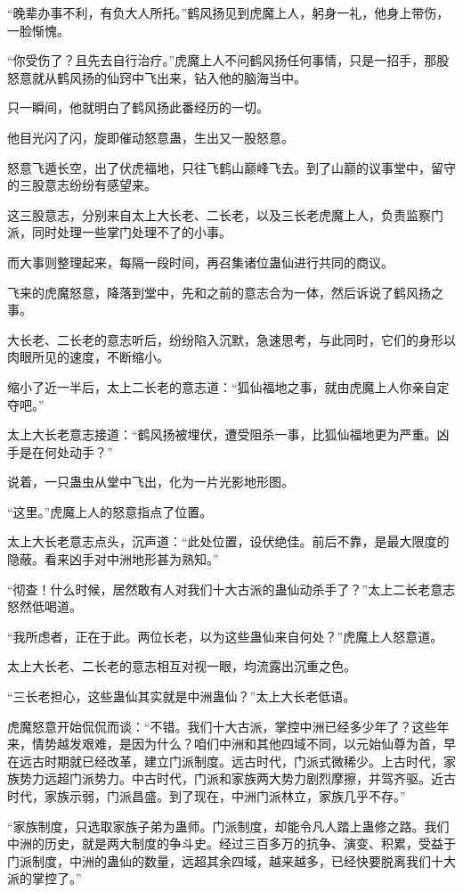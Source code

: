 \begin{this_body}
“晚辈办事不利，有负大人所托。”鹤风扬见到虎魔上人，躬身一礼，他身上带伤，一脸惭愧。

“你受伤了？且先去自行治疗。”虎魔上人不问鹤风扬任何事情，只是一招手，那股怒意就从鹤风扬的仙窍中飞出来，钻入他的脑海当中。

只一瞬间，他就明白了鹤风扬此番经历的一切。

他目光闪了闪，旋即催动怒意蛊，生出又一股怒意。

怒意飞遁长空，出了伏虎福地，只往飞鹤山巅峰飞去。到了山巅的议事堂中，留守的三股意志纷纷有感望来。

这三股意志，分别来自太上大长老、二长老，以及三长老虎魔上人，负责监察门派，同时处理一些掌门处理不了的小事。

而大事则整理起来，每隔一段时间，再召集诸位蛊仙进行共同的商议。

飞来的虎魔怒意，降落到堂中，先和之前的意志合为一体，然后诉说了鹤风扬之事。

大长老、二长老的意志听后，纷纷陷入沉默，急速思考，与此同时，它们的身形以肉眼所见的速度，不断缩小。

缩小了近一半后，太上二长老的意志道：“狐仙福地之事，就由虎魔上人你亲自定夺吧。”

太上大长老意志接道：“鹤风扬被埋伏，遭受阻杀一事，比狐仙福地更为严重。凶手是在何处动手？”

说着，一只蛊虫从堂中飞出，化为一片光影地形图。

“这里。”虎魔上人的怒意指点了位置。

太上大长老意志点头，沉声道：“此处位置，设伏绝佳。前后不靠，是最大限度的隐蔽。看来凶手对中洲地形甚为熟知。”

“彻查！什么时候，居然敢有人对我们十大古派的蛊仙动杀手了？”太上二长老意志怒然低喝道。

“我所虑者，正在于此。两位长老，以为这些蛊仙来自何处？”虎魔上人怒意道。

太上大长老、二长老的意志相互对视一眼，均流露出沉重之色。

“三长老担心，这些蛊仙其实就是中洲蛊仙？”太上大长老低语。

虎魔怒意开始侃侃而谈：“不错。我们十大古派，掌控中洲已经多少年了？这些年来，情势越发艰难，是因为什么？咱们中洲和其他四域不同，以元始仙尊为首，早在远古时期就已经改革，建立门派制度。远古时代，门派式微稀少。上古时代，家族势力远超门派势力。中古时代，门派和家族两大势力剧烈摩擦，并驾齐驱。近古时代，家族示弱，门派昌盛。到了现在，中洲门派林立，家族几乎不存。”

“家族制度，只选取家族子弟为蛊师。门派制度，却能令凡人踏上蛊修之路。我们中洲的历史，就是两大制度的争斗史。经过三百多万的抗争、演变、积累，受益于门派制度，中洲的蛊仙的数量，远超其余四域，越来越多，已经快要脱离我们十大派的掌控了。”


\end{this_body}
